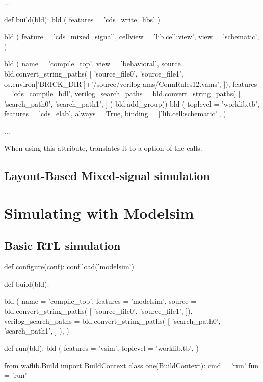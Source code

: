 \begin{lstwscript}
...

def build(bld):
    bld ( features = 'cds_write_libs' )

    bld (
        feature = 'cds_mixed_signal',
        cellview = 'lib.cell:view',
        view = 'schematic',
    )

    bld (
        name = 'compile_top',
        view = 'behavioral',
        source = bld.convert_string_paths(
            [
                'source_file0',
                'source_file1',
                os.environ['BRICK_DIR']+'/source/verilog-ams/ConnRules12.vams',
            ]),
        features = 'cds_compile_hdl',
        verilog_search_paths = bld.convert_string_paths(
            [
                'search_path0',
                'search_path1',
            ]
    )
    bld.add_group()
    bld (
        toplevel = 'worklib.tb',
        features = 'cds_elab',
        always = True,
        binding = ['lib.cell:schematic'],
    )

...
\end{lstwscript}

When using this attribute,  translates it to a  option of
the  calls.

\subsection{Layout-Based Mixed-signal simulation}

\section{Simulating with Modelsim}
\subsection{Basic RTL simulation}
\label{sec:modelsim_basic_rtl}

\begin{lstwscript}
def configure(conf):
    conf.load('modelsim')

def build(bld):

    bld (
        name = 'compile_top',
        features = 'modelsim',
		source = bld.convert_string_paths(
            [
                'source_file0',
                'source_file1',
            ]),
        verilog_search_paths = bld.convert_string_paths(
            [
                'search_path0',
                'search_path1',
            ]
        ),
    )   


def run(bld):
    bld (
        features = 'vsim',
        toplevel = 'worklib.tb',
    )   

from waflib.Build import BuildContext
class one(BuildContext):
    cmd = 'run'
    fun = 'run'
\end{lstwscript}

